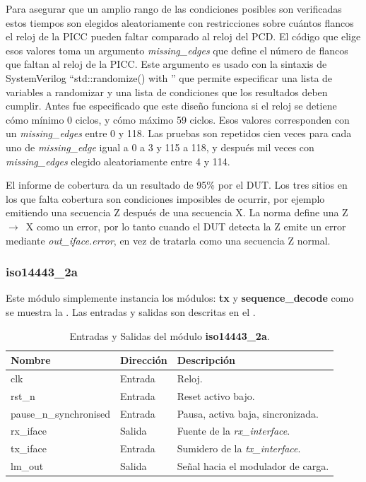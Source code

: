 \documentclass[a4paper, twoside, 11pt]{report}
\begin{document}
Para asegurar que un amplio rango de las condiciones posibles son verificadas estos tiempos son elegidos aleatoriamente con restricciones sobre cuántos flancos el reloj de la PICC pueden faltar comparado al reloj del PCD. El código que elige esos valores toma un argumento \textit{missing\_edges} que define el número de flancos que faltan al reloj de la PICC. Este argumento es usado con la sintaxis de SystemVerilog “std::randomize() with {}” que permite especificar una lista de variables a randomizar y una lista de condiciones que los resultados deben cumplir. Antes fue especificado que este diseño funciona si el reloj se detiene cómo mínimo 0 ciclos, y cómo máximo 59 ciclos. Esos valores corresponden con un \textit{missing\_edges} entre 0 y 118. Las pruebas son repetidos cien veces para cada uno de \textit{missing\_edge} igual a  0 a 3 y 115 a 118, y después mil veces con \textit{missing\_edges} elegido aleatoriamente entre 4 y 114.

El informe de cobertura da un resultado de 95\% por el DUT. Los tres sitios en los que falta cobertura son condiciones imposibles de ocurrir, por ejemplo emitiendo una secuencia Z después de una secuencia X. La norma define una Z~$\rightarrow$~X como un error, por lo tanto cuando el DUT detecta la Z emite un error mediante \textit{out\_iface.error}, en vez de tratarla como una secuencia Z normal.

\FloatBarrier
\subsubsection{iso14443\_2a}

Este módulo simplemente instancia los módulos: \textbf{tx} y \textbf{sequence\_decode} como se muestra la . Las entradas y salidas son descritas en el .

\begin{table}[htb]
  \centering
  \tablezebra
  \begin{tabulary}{\linewidth}{l|l|L}
    \textbf{Nombre}&\textbf{Dirección}&\textbf{Descripción} \\
    \hline
    clk&Entrada&Reloj. \\
    rst\_n&Entrada&Reset activo bajo. \\
    pause\_n\_synchronised &Entrada&Pausa, activa baja, sincronizada. \\
    rx\_iface&Salida&Fuente de la \textit{rx\_interface}. \\
    tx\_iface&Entrada&Sumidero de la \textit{tx\_interface}. \\
    lm\_out&Salida&Señal hacia el modulador de carga. \\
  \end{tabulary}
  \caption{Entradas y Salidas del módulo \textbf{iso14443\_2a}.}
  \label{tab:ports_iso14443_2a}
\end{table}
\end{document}
